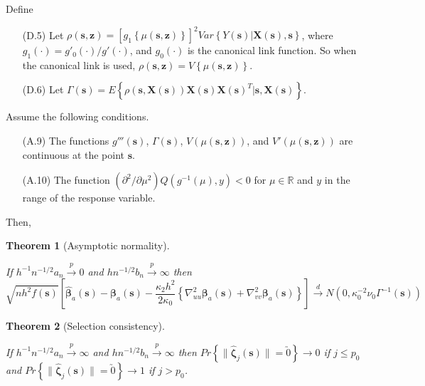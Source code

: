 \documentclass[authoryear,review, 12pt]{elsarticle}
\newtheorem{thm}{Theorem}
\begin{document}
Define
\begin{itemize}
\item[(D.5)] Let $\rho\left(\bm{s},\bm{z}\right)=\left[g_{1}\left\{ \mu\left(\bm{s},\bm{z}\right)\right\} \right]^{2}Var\left\{ Y\left(\bm{s}\right)|\bm{X}\left(\bm{s}\right),\bm{s}\right\} $,
where $g_{1}\left(\cdot\right)=g'_{0}\left(\cdot\right)/g'\left(\cdot\right)$,
and $g_{0}\left(\cdot\right)$ is the canonical link function. So
when the canonical link is used, $\rho\left(\bm{s},\bm{z}\right)=V\left\{ \mu\left(\bm{s},\bm{z}\right)\right\} $.
\item[(D.6)] Let $\Gamma\left(\bm{s}\right)=E\left\{ \rho\left(\bm{s},\bm{X}\left(\bm{s}\right)\right)\bm{X}\left(\bm{s}\right)\bm{X}\left(\bm{s}\right)^{T}|\bm{s},\bm{X}\left(\bm{s}\right)\right\} $.
\end{itemize}
Assume the following conditions.
\begin{itemize}
\item[(A.9)] The functions $g'''\left(\bm{s}\right)$, $\Gamma\left(\bm{s}\right)$,
$V\left(\mu\left(\bm{s},\bm{z}\right)\right)$, and $V'\left(\mu\left(\bm{s},\bm{z}\right)\right)$
are continuous at the point $\bm{s}$.
\item[(A.10)] The function $\left(\partial^{2}/\partial\mu^{2}\right)Q\left(g^{-1}\left(\mu\right),y\right)<0$
for $\mu\in\mathbb{R}$ and $y$ in the range of the response variable.
\end{itemize}
Then,
\begin{thm}[Asymptotic normality]
\label{theorem:normality-glm} 



If $h^{-1}n^{-1/2}a_{n}\xrightarrow{p}0$ and $hn^{-1/2}b_{n}\xrightarrow{p}\infty$
then 
\[
\sqrt{nh^{2}f\left(\bm{s}\right)}\left[\hat{\bm{\beta}}_{a}(\bm{s})-\bm{\beta}_{a}(\bm{s})-\frac{\kappa_{2}h^{2}}{2\kappa_{0}}\left\{ \nabla_{uu}^{2}\bm{\beta}_{a}(\bm{s})+\nabla_{vv}^{2}\bm{\beta}_{a}(\bm{s})\right\} \right]\xrightarrow{d}N\left(0,\kappa_{0}^{-2}\nu_{0}\Gamma^{-1}(\bm{s})\right)
\]

\end{thm}

\begin{thm}[Selection consistency]
\label{theorem:selection-glm}



If $h^{-1}n^{-1/2}a_{n}\xrightarrow{p}\infty$ and $hn^{-1/2}b_{n}\xrightarrow{p}\infty$
then $Pr\left\{ \|\hat{\bm{\zeta}}_{j}(\bm{s})\|=\utilde{0}\right\} \to0$
if $j\le p_{0}$ and $Pr\left\{ \|\hat{\bm{\zeta}}_{j}(\bm{s})\|=\utilde{0}\right\} \to1$
if $j>p_{0}$. 
\end{thm}
\end{document}
